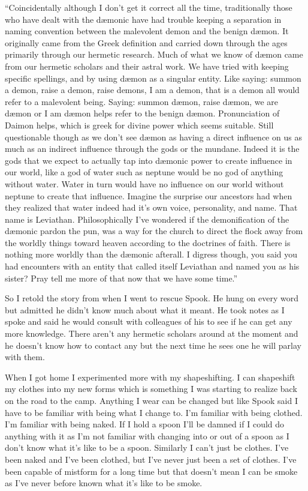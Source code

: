 ``Coincidentally although I don't get it correct all the time, traditionally those who have dealt with the d\ae monic have had trouble keeping a separation in naming convention between the malevolent demon and the benign d\ae mon. It originally came from the Greek definition and carried down through the ages primarily through our hermetic research. Much of what we know of d\ae mon came from our hermetic scholars and their astral work. We have tried with keeping specific spellings, and by using d\ae mon as a singular entity. Like saying: summon a demon, raise a demon, raise demons, I am a demon, that is a demon all would refer to a malevolent being. Saying: summon d\ae mon, raise d\ae mon, we are d\ae mon or I am d\ae mon helps refer to the benign d\ae mon. Pronunciation of Daimon helps, which is greek for divine power which seems suitable. Still questionable though as we don't see d\ae mon as having a direct influence on us as much as an indirect influence through the gods or the mundane. Indeed it is the gods that we expect to actually tap into d\ae monic power to create influence in our world, like a god of water such as neptune would be no god of anything without water. Water in turn would have no influence on our world without neptune to create that influence. Imagine the surprise our ancestors had when they realized that water indeed had it's own voice, personality, and name. That name is Leviathan. Philosophically I've wondered if the demonification of the d\ae monic pardon the pun, was a way for the church to direct the flock away from the worldly things toward heaven according to the doctrines of faith. There is nothing more worldly than the d\ae monic afterall. I digress though, you said you had encounters with an entity that called itself Leviathan and named you as his sister? Pray tell me more of that now that we have some time.''

So I retold the story from when I went to rescue Spook. He hung on every word but admitted he didn't know much about what it meant. He took notes as I spoke and said he would consult with colleagues of his to see if he can get any more knowledge. There aren't any hermetic scholars around at the moment and he doesn't know how to contact any but the next time he sees one he will parlay with them.

When I got home I experimented more with my shapeshifting. I can shapeshift my clothes into my new forms which is something I was starting to realize back on the road to the camp. Anything I wear can be changed but like Spook said I have to be familiar with being what I change to. I'm familiar with being clothed. I'm familiar with being naked. If I hold a spoon I'll be damned if I could do anything with it as I'm not familiar with changing into or out of a spoon as I don't know what it's like to be a spoon. Similarly I can't just be clothes. I've been naked and I've been clothed, but I've never just been a set of clothes. I've been capable of mistform for a long time but that doesn't mean I can be smoke as I've never before known what it's like to be smoke. 

